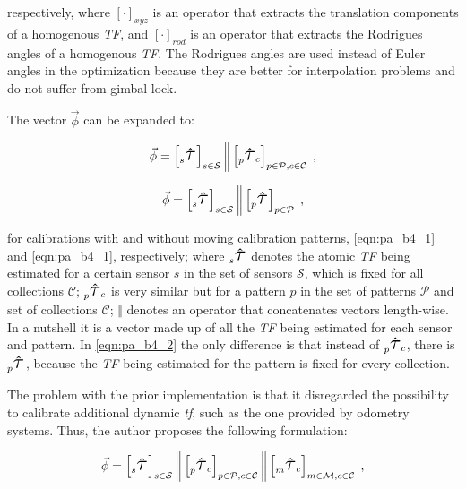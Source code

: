 \documentclass{ieeeaccess}
\newcommand{\Tau}{\scalebox{1.60}{$\tau$}}
\newcommand{\optParam}[2]{\prescript{}{#1}{\mathbf{\hat{\Tau}}_{#2}}}
\begin{document}
\noindent respectively, where $[\cdot]_{xyz}$ is an operator that extracts the translation components of a
homogenous \textit{TF}, and  $[\cdot]_{rod}$ is an operator that extracts the Rodrigues angles of a homogenous
\textit{TF}. The Rodrigues angles are used instead of Euler angles in the optimization because they are better for
interpolation problems and do not suffer from gimbal lock.

The vector $\vec{\phi}$ can be expanded to:

\begin{equation}
  \label{eqn:pa_b4_1}
\vec{\phi} = \left[ \optParam{s}{} \right]_{s \in \mathcal{S}} \bigg\Vert
                      \left[ \optParam{p}{c} \right]_{p \in \mathcal{P}, c \in \mathcal{C}} \; ,
\end{equation}

\begin{equation}
  \label{eqn:pa_b4_2}
\vec{\phi} = \left[ \optParam{s}{} \right]_{s \in \mathcal{S}} \bigg\Vert
                      \left[ \optParam{p}{} \right]_{p \in \mathcal{P}}\; ,
\end{equation}

\noindent for calibrations with and without moving calibration patterns, \autoref{eqn:pa_b4_1} and
\autoref{eqn:pa_b4_1}, respectively; where $\optParam{s}{}$ denotes the atomic \textit{TF} being estimated for a
certain sensor $s$ in the set of sensors $\mathcal{S}$, which is fixed for all collections $\mathcal{C}$; $\optParam{p}{c}$ is very similar but for a pattern $p$ in the set of
patterns $\mathcal{P}$ and set of collections $\mathcal{C}$; $\Vert$ denotes an operator that concatenates vectors length-wise. In a nutshell it is
a vector made up of all the \textit{TF} being estimated for each sensor and pattern. In \autoref{eqn:pa_b4_2} the
only difference is that instead of $\optParam{p}{c}$, there is $\optParam{p}{}$, because the \textit{TF} being
estimated for the pattern is fixed for every collection.

The problem with the prior implementation is that it disregarded the possibility to calibrate additional
dynamic \textit{tf}, such as the one provided by odometry systems. Thus, the author proposes the following
formulation:

\begin{equation}
  \label{eqn:pa_b4_3}
\vec{\phi} = \left[ \optParam{s}{} \right]_{s \in \mathcal{S}} \bigg\Vert
                      \left[ \optParam{p}{c} \right]_{p \in \mathcal{P}, c \in \mathcal{C}} \bigg\Vert
                      \left[ \optParam{m}{c} \right]_{m \in \mathcal{M}, c \in \mathcal{C}}\; ,
\end{equation}
\end{document}
